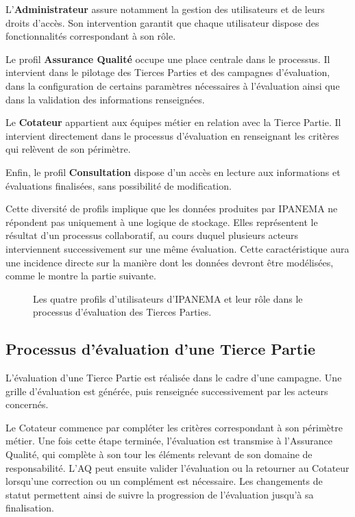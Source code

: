 L’\textbf{Administrateur} assure notamment la gestion des utilisateurs et de leurs droits d’accès. 
Son intervention garantit que chaque utilisateur dispose des fonctionnalités correspondant à 
son rôle. 

Le profil \textbf{Assurance Qualité} occupe une place centrale dans le processus. Il intervient 
dans le pilotage des Tierces Parties et des campagnes d’évaluation, dans la configuration de 
certains paramètres nécessaires à l’évaluation ainsi que dans la validation des informations 
renseignées. 

Le \textbf{Cotateur} appartient aux équipes métier en relation avec la Tierce Partie. Il intervient 
directement dans le processus d’évaluation en renseignant les critères qui relèvent de son 
périmètre. 

Enfin, le profil \textbf{Consultation} dispose d’un accès en lecture aux informations et 
évaluations finalisées, sans possibilité de modification. 

Cette diversité de profils implique que les données produites par IPANEMA ne répondent 
pas uniquement à une logique de stockage. Elles représentent le résultat d’un processus 
collaboratif, au cours duquel plusieurs acteurs interviennent successivement sur une même évaluation. Cette caractéristique aura une incidence directe sur la manière dont les données 
devront être modélisées, comme le montre la partie suivante.

\begin{figure}[H]
    \centering
    \caption{Les quatre profils d'utilisateurs d'IPANEMA et leur rôle dans le processus d'évaluation des Tierces Parties.}
    \label{fig:quatre_profils_d'utilisateurs}
\end{figure}


\subsection{Processus d’évaluation d’une Tierce Partie }

L’évaluation d’une Tierce Partie est réalisée dans le cadre d’une campagne. Une grille 
d’évaluation est générée, puis renseignée successivement par les acteurs concernés. 

Le Cotateur commence par compléter les critères correspondant à son périmètre 
métier. Une fois cette étape terminée, l’évaluation est transmise à l’Assurance Qualité, qui 
complète à son tour les éléments relevant de son domaine de responsabilité. L’AQ peut 
ensuite valider l’évaluation ou la retourner au Cotateur lorsqu’une correction ou un 
complément est nécessaire. Les changements de statut permettent ainsi de suivre la 
progression de l’évaluation jusqu’à sa finalisation.  

